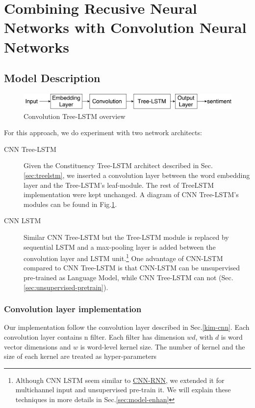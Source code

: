 \hypertarget{sec:CNNtree}{\section{Combining Recusive Neural Networks with Convolution Neural Networks}}\label{sec:CNNtree}
\subsection{Model Description}
\begin{figure}[H]
    \centering
    \includegraphics[width=0.8\linewidth]{figure/convtreelstmsummary}
    \caption[Convolution Tree-LSTM overview]{Convolution Tree-LSTM overview}
    \label{fig:convtreelstmsummary}
\end{figure}
For this approach, we do experiment with two network architects:
\begin{description}
\item[CNN Tree-LSTM] Given the Constituency Tree-LSTM architect described in Sec.\ref{sec:treelstm},  we inserted a convolution layer between the word embedding layer and the Tree-LSTM's leaf-module.
The rest of TreeLSTM implementation were kept unchanged.
A diagram of CNN Tree-LSTM's modules can be found in Fig.\ref{fig:convtreelstmsummary}.
\item[CNN LSTM] Similar CNN Tree-LSTM but the Tree-LSTM module is replaced by sequential LSTM and a max-pooling layer is added between the convolution layer and LSTM unit.\footnote{Although CNN LSTM seem similar to \hyperref[cnn-rnn]{CNN-RNN}\cite{cnn-rnn}, we extended it for multichannel input and unsupervised pre-train it. We will explain these techniques in more details in Sec.\ref{sec:model-enhan}} 
One advantage of CNN-LSTM compared to CNN Tree-LSTM is that CNN-LSTM can be unsupervised pre-trained as Language Model, while CNN Tree-LSTM can not (Sec.\ref{sec:unsupervised-pretrain}).
\end{description}


\subsubsection{Convolution layer implementation} \label{sec:conv1c}
Our implementation follow the convolution layer described in Sec.\ref{kim-cnn}.
Each convolution layer contains n filter. 
Each filter has dimension $wd$, with \(d\) is word vector dimensions and \(w\) is word-level kernel size. 
The number of kernel and the size of each kernel are treated as hyper-parameters 

